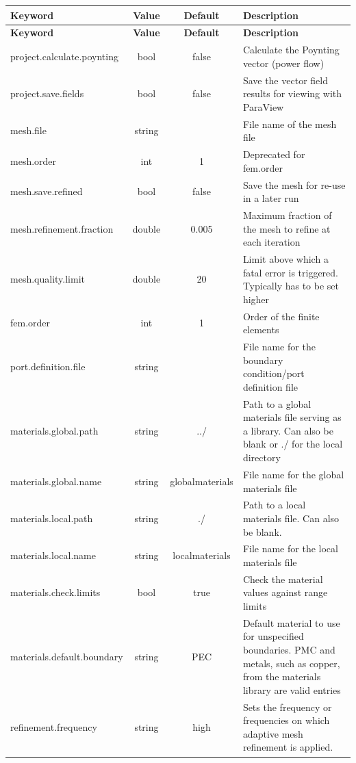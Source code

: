 \documentclass[titlepage]{article}
\renewcommand\_{\textunderscore\linebreak[1]}
\begin{document}
\tabcolsep=0.05cm
\small
\begin{longtable}[c]{|lccp{8cm}|}
    \hline
    \textbf{Keyword} & \textbf{Value} & \textbf{Default} & \textbf{Description} \\
    \hline
    \endfirsthead
    \hline
    \textbf{Keyword} & \textbf{Value} & \textbf{Default} & \textbf{Description} \\
    \hline
    \endhead
    project.calculate.poynting   & bool   & false & Calculate the Poynting vector (power flow) \\
    project.save.fields          & bool   & false & Save the vector field results for viewing with ParaView \\
    mesh.file                    & string &       & File name of the mesh file \\
    mesh.order                   & int    & 1     & Deprecated for fem.order \\
    mesh.save.refined            & bool   & false & Save the mesh for re-use in a later run \\
    mesh.refinement.fraction     & double & 0.005 & Maximum fraction of the mesh to refine at each iteration \\
    mesh.quality.limit           & double & 20    & Limit above which a fatal error is triggered. Typically has to be set higher \\
    fem.order                    & int    & 1     & Order of the finite elements \\
    port.definition.file         & string &       & File name for the boundary condition/port definition file \\
    materials.global.path        & string & ../   & Path to a global materials file serving as a library.  Can also be blank or ./ for the local directory \\
    materials.global.name        & string & global\_materials & File name for the global materials file \\
    materials.local.path         & string & ./    & Path to a local materials file. Can also be blank. \\
    materials.local.name         & string & local\_materials & File name for the local materials file \\
    materials.check.limits       & bool   & true  & Check the material values against range limits \\
    materials.default.boundary   & string & PEC   & Default material to use for unspecified boundaries.  PMC and metals, such as copper, from the materials library are valid entries \\
    refinement.frequency         & string & high & Sets the frequency or frequencies on which adaptive mesh refinement is applied.
                                                   

\end{longtable}
\end{document}
